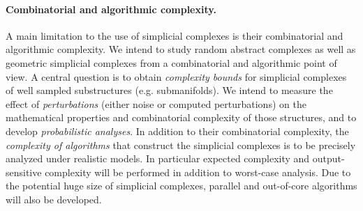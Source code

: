 



\paragraph{Combinatorial and algorithmic complexity.}
A main limitation to the use of simplicial complexes is their combinatorial and algorithmic complexity. %
We intend to study random abstract complexes as well as geometric simplicial complexes from a combinatorial and algorithmic point of view. A central question is to obtain {\em complexity bounds} for simplicial complexes of well sampled substructures (e.g. submanifolds).  We intend to measure the effect of {\em perturbations} (either noise or computed perturbations) on the mathematical properties and combinatorial complexity of those structures, and to develop {\em probabilistic analyses}. 
In addition to their combinatorial complexity, the {\em complexity of algorithms} that construct the simplicial complexes is to be precisely analyzed under realistic models. In particular expected complexity and output-sensitive complexity will be performed in addition to worst-case analysis. Due to the potential huge size of simplicial complexes, parallel and out-of-core algorithms will also be developed. %


